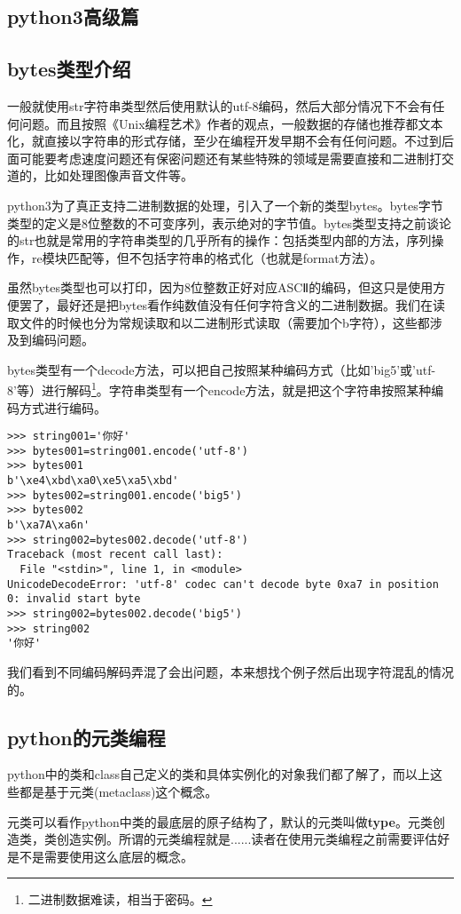 \documentclass[12pt,oneside]{book}
\begin{document}
\begin{common-format}
\part{python3高级篇}


\chapter{bytes类型介绍}
一般就使用str字符串类型然后使用默认的utf-8编码，然后大部分情况下不会有任何问题。而且按照《Unix编程艺术》作者的观点，一般数据的存储也推荐都文本化，就直接以字符串的形式存储，至少在编程开发早期不会有任何问题。不过到后面可能要考虑速度问题还有保密问题还有某些特殊的领域是需要直接和二进制打交道的，比如处理图像声音文件等。

python3为了真正支持二进制数据的处理，引入了一个新的类型bytes。bytes字节类型的定义是8位整数的不可变序列，表示绝对的字节值。bytes类型支持之前谈论的str也就是常用的字符串类型的几乎所有的操作：包括类型内部的方法，序列操作，re模块匹配等，但不包括字符串的格式化（也就是format方法）。

虽然bytes类型也可以打印，因为8位整数正好对应ASCⅡ的编码，但这只是使用方便罢了，最好还是把bytes看作纯数值没有任何字符含义的二进制数据。我们在读取文件的时候也分为常规读取和以二进制形式读取（需要加个b字符），这些都涉及到编码问题。

bytes类型有一个decode方法，可以把自己按照某种编码方式（比如'big5'或'utf-8'等）进行解码\footnote{二进制数据难读，相当于密码。}。字符串类型有一个encode方法，就是把这个字符串按照某种编码方式进行编码。
\begin{Verbatim}
>>> string001='你好'
>>> bytes001=string001.encode('utf-8')
>>> bytes001
b'\xe4\xbd\xa0\xe5\xa5\xbd'
>>> bytes002=string001.encode('big5')
>>> bytes002
b'\xa7A\xa6n'
>>> string002=bytes002.decode('utf-8')
Traceback (most recent call last):
  File "<stdin>", line 1, in <module>
UnicodeDecodeError: 'utf-8' codec can't decode byte 0xa7 in position 0: invalid start byte
>>> string002=bytes002.decode('big5')
>>> string002
'你好'
\end{Verbatim}

我们看到不同编码解码弄混了会出问题，本来想找个例子然后出现字符混乱的情况的。


\chapter{python的元类编程}
python中的类和class自己定义的类和具体实例化的对象我们都了解了，而以上这些都是基于元类(metaclass)这个概念。

元类可以看作python中类的最底层的原子结构了，默认的元类叫做\textbf{type}。元类创造类，类创造实例。所谓的元类编程就是......读者在使用元类编程之前需要评估好是不是需要使用这么底层的概念。


\end{common-format}
\end{document}
